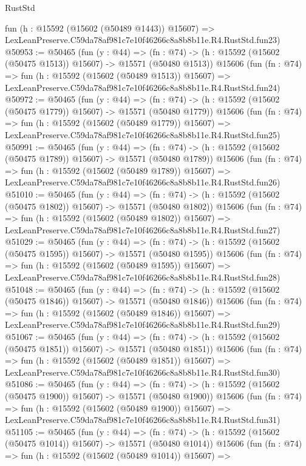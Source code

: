 \begin{lexlean}{RustStd}
\begin{coremodule}
    fun (h : @15592 (@15602 (@50489 @1443)) @15607) =>
    LexLeanPreserve.C59da78af981c7e10f46266c8a8b8b11e.R4.RustStd.fun23)
@50953 := @50465
    (fun (y : @44) =>
    (fn : @74) -> (h : @15592 (@15602 (@50475 @1513)) @15607) -> @15571 (@50480 @1513))
    @15606
    (fun (fn : @74) =>
    fun (h : @15592 (@15602 (@50489 @1513)) @15607) =>
    LexLeanPreserve.C59da78af981c7e10f46266c8a8b8b11e.R4.RustStd.fun24)
@50972 := @50465
    (fun (y : @44) =>
    (fn : @74) -> (h : @15592 (@15602 (@50475 @1779)) @15607) -> @15571 (@50480 @1779))
    @15606
    (fun (fn : @74) =>
    fun (h : @15592 (@15602 (@50489 @1779)) @15607) =>
    LexLeanPreserve.C59da78af981c7e10f46266c8a8b8b11e.R4.RustStd.fun25)
@50991 := @50465
    (fun (y : @44) =>
    (fn : @74) -> (h : @15592 (@15602 (@50475 @1789)) @15607) -> @15571 (@50480 @1789))
    @15606
    (fun (fn : @74) =>
    fun (h : @15592 (@15602 (@50489 @1789)) @15607) =>
    LexLeanPreserve.C59da78af981c7e10f46266c8a8b8b11e.R4.RustStd.fun26)
@51010 := @50465
    (fun (y : @44) =>
    (fn : @74) -> (h : @15592 (@15602 (@50475 @1802)) @15607) -> @15571 (@50480 @1802))
    @15606
    (fun (fn : @74) =>
    fun (h : @15592 (@15602 (@50489 @1802)) @15607) =>
    LexLeanPreserve.C59da78af981c7e10f46266c8a8b8b11e.R4.RustStd.fun27)
@51029 := @50465
    (fun (y : @44) =>
    (fn : @74) -> (h : @15592 (@15602 (@50475 @1595)) @15607) -> @15571 (@50480 @1595))
    @15606
    (fun (fn : @74) =>
    fun (h : @15592 (@15602 (@50489 @1595)) @15607) =>
    LexLeanPreserve.C59da78af981c7e10f46266c8a8b8b11e.R4.RustStd.fun28)
@51048 := @50465
    (fun (y : @44) =>
    (fn : @74) -> (h : @15592 (@15602 (@50475 @1846)) @15607) -> @15571 (@50480 @1846))
    @15606
    (fun (fn : @74) =>
    fun (h : @15592 (@15602 (@50489 @1846)) @15607) =>
    LexLeanPreserve.C59da78af981c7e10f46266c8a8b8b11e.R4.RustStd.fun29)
@51067 := @50465
    (fun (y : @44) =>
    (fn : @74) -> (h : @15592 (@15602 (@50475 @1851)) @15607) -> @15571 (@50480 @1851))
    @15606
    (fun (fn : @74) =>
    fun (h : @15592 (@15602 (@50489 @1851)) @15607) =>
    LexLeanPreserve.C59da78af981c7e10f46266c8a8b8b11e.R4.RustStd.fun30)
@51086 := @50465
    (fun (y : @44) =>
    (fn : @74) -> (h : @15592 (@15602 (@50475 @1900)) @15607) -> @15571 (@50480 @1900))
    @15606
    (fun (fn : @74) =>
    fun (h : @15592 (@15602 (@50489 @1900)) @15607) =>
    LexLeanPreserve.C59da78af981c7e10f46266c8a8b8b11e.R4.RustStd.fun31)
@51105 := @50465
    (fun (y : @44) =>
    (fn : @74) -> (h : @15592 (@15602 (@50475 @1014)) @15607) -> @15571 (@50480 @1014))
    @15606
    (fun (fn : @74) =>
    fun (h : @15592 (@15602 (@50489 @1014)) @15607) =>

\end{coremodule}
\end{lexlean}
